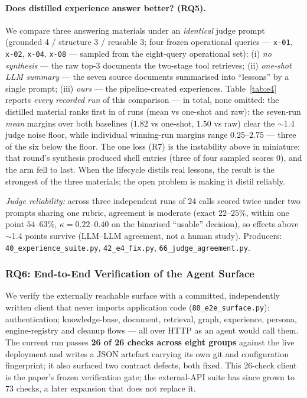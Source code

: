 \documentclass[sigconf, review, anonymous]{acmart}
\begin{document}
\paragraph{Does distilled experience answer better? (RQ5).}
We compare three answering materials under an \emph{identical} judge prompt
(grounded 4 / structure 3 / reusable 3; four frozen operational queries ---
\texttt{x-01}, \texttt{x-02}, \texttt{x-04}, \texttt{x-08} --- sampled from
the eight-query operational set):
(i) \emph{no synthesis} --- the raw top-$3$ documents the two-stage tool
retrieves; (ii) \emph{one-shot LLM summary} --- the seven source documents
summarised into ``lessons'' by a single prompt; (iii) \emph{ours} --- the
pipeline-created experiences. Table~\ref{tab:e4} reports \emph{every recorded
run} of this comparison --- \eFourRuns{} in total, none omitted: the
distilled material ranks first in \eFourFirsts{} of \eFourRuns{} runs (mean
\eFourOursMean{} vs \eFourLlmMean{} one-shot and \eFourRawMean{} raw): the
seven-run \emph{mean} margins over both baselines ($1.82$ vs one-shot, $1.50$
vs raw) clear the $\sim$1.4 judge noise floor, while individual winning-run
margins range $0.25$--$2.75$ --- three of the six below the floor. The one
loss (R7) is the
instability above in miniature: that round's synthesis produced shell entries
(three of four sampled scores $0$), and the arm fell to last. When the
lifecycle distils real lessons, the result is the strongest of the three
materials; the open problem is making it distil reliably.



\emph{Judge reliability:} across three independent runs of 24 calls scored
twice under two prompts sharing one rubric, agreement is moderate (exact
$22$--$25\%$, within one point $54$--$63\%$, $\kappa{=}0.22$--$0.40$ on the
binarised ``usable'' decision), so effects above $\sim$1.4 points survive
(LLM--LLM agreement, not a human study). Producers:
\texttt{40\_experience\_suite.py}, \texttt{42\_e4\_fix.py},
\texttt{66\_judge\_agreement.py}.

\subsubsection{RQ6: End-to-End Verification of the Agent Surface}\label{sec:e2e}
We verify the externally reachable surface with a committed, independently
written client that never imports application code
(\texttt{80\_e2e\_surface.py}): authentication; knowledge-base, document,
retrieval, graph, experience, persona, engine-registry and cleanup flows ---
all over HTTP as an agent would call them. The current run passes \textbf{26
of 26 checks across eight groups} against the live deployment and writes a
JSON artefact carrying its own git and configuration fingerprint; it also
surfaced two contract defects, both fixed. This 26-check client is the
paper's frozen verification gate; the external-API suite has since grown to
73 checks, a later expansion that does not replace it.
\end{document}
